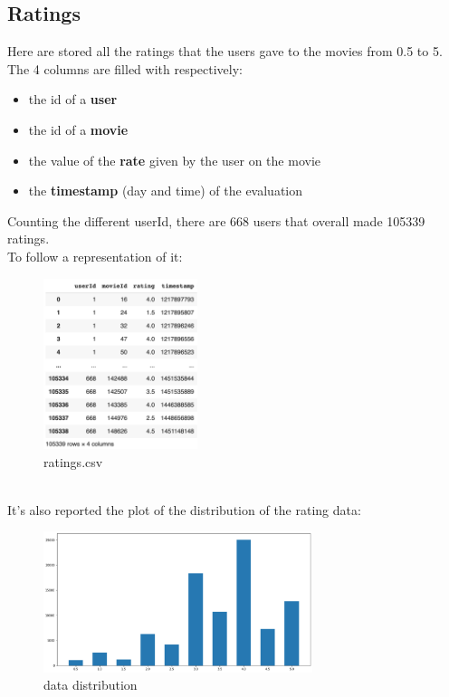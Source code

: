 \documentclass{article}
\begin{document}
\subsection{Ratings}
Here are stored all the ratings that the users gave to the movies from 0.5 to 5. The 4 columns are filled with respectively: 
\begin{itemize}
      \item the id of a \textbf{user}
      \item the id of a \textbf{movie}
      \item the value of the \textbf{rate} given by the user on the movie
      \item the \textbf{timestamp} (day and time) of the evaluation
\end{itemize}
Counting the different userId, there are 668 users that overall made 105339 ratings. \\
To follow a representation of it:
\begin{figure}[ht]
      \begin{center}
            \includegraphics[width=0.4\textwidth]{images/ratings data.png}
      \end{center}
      \caption{ratings.csv}
      \label{fig:ratings.csv}
\end{figure}\\
It's also reported the plot of the distribution of the rating data:
\begin{figure}[ht]
      \begin{center}
            \includegraphics[width=0.7\textwidth]{images/rating distributions.png}
      \end{center}
      \caption{data distribution}
      \label{fig:data distribution}
\end{figure}
\end{document}
